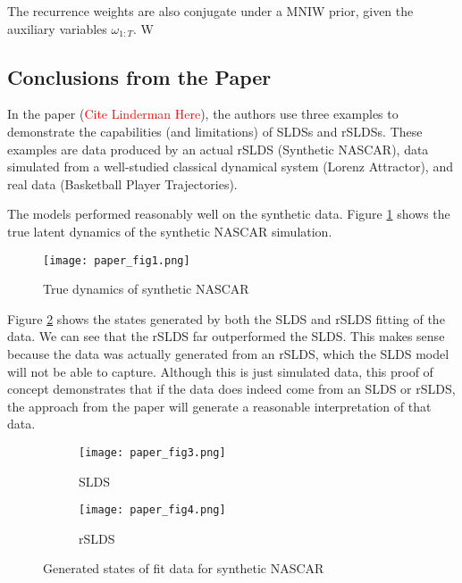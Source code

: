 The recurrence weights are also conjugate under a MNIW prior, given the auxiliary variables $\omega_{1: T}$. W





\subsection{Conclusions from the Paper}

In the paper (\textcolor{red}{Cite Linderman Here}), the authors use three examples to demonstrate the capabilities (and limitations) of SLDSs and rSLDSs. These examples are data produced by an actual rSLDS (Synthetic NASCAR), data simulated from a well-studied classical dynamical system (Lorenz Attractor), and real data (Basketball Player Trajectories).

The models performed reasonably well on the synthetic data. Figure \ref{trueNascar} shows the true latent dynamics of the synthetic NASCAR simulation.
\begin{figure}[h!]
	\centering
	\texttt{[image: paper\_fig1.png]}
	\caption{True dynamics of synthetic NASCAR}
	\label{trueNascar}
\end{figure}

Figure \ref{Nascargen} shows the states generated by both the SLDS and rSLDS fitting of the data. We can see that the rSLDS far outperformed the SLDS. This makes sense because the data was actually generated from an rSLDS, which the SLDS model will not be able to capture. Although this is just simulated data, this proof of concept demonstrates that if the data does indeed come from an SLDS or rSLDS, the approach from the paper will generate a reasonable interpretation of that data.

\begin{figure}[h!]
	\centering
	\begin{subfigure}[b]{0.35\textwidth}
		\texttt{[image: paper\_fig3.png]}
		\caption{SLDS}
	\end{subfigure}
	\begin{subfigure}[b]{0.35\textwidth}
		\texttt{[image: paper\_fig4.png]}
		\caption{rSLDS}
	\end{subfigure}
	\caption{Generated states of fit data for synthetic NASCAR}
	\label{Nascargen}
\end{figure}

